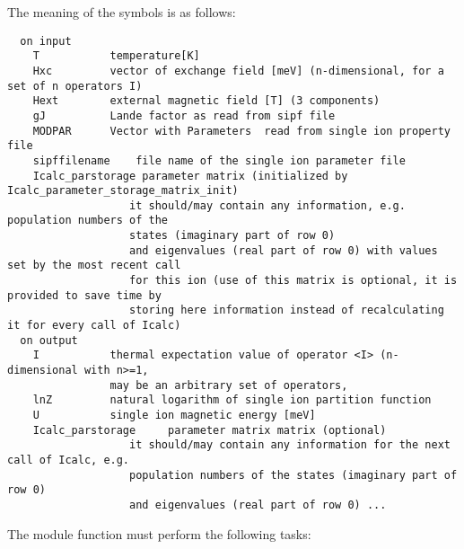 The meaning of the symbols is as follows:
{\footnotesize
\begin{verbatim}
  on input
    T           temperature[K]
    Hxc         vector of exchange field [meV] (n-dimensional, for a set of n operators I)
    Hext        external magnetic field [T] (3 components)
    gJ          Lande factor as read from sipf file
    MODPAR      Vector with Parameters  read from single ion property file
    sipffilename    file name of the single ion parameter file
    Icalc_parstorage parameter matrix (initialized by Icalc_parameter_storage_matrix_init)
                   it should/may contain any information, e.g. population numbers of the
                   states (imaginary part of row 0)
                   and eigenvalues (real part of row 0) with values set by the most recent call
                   for this ion (use of this matrix is optional, it is provided to save time by
                   storing here information instead of recalculating it for every call of Icalc)
  on output    
    I           thermal expectation value of operator <I> (n- dimensional with n>=1,
                may be an arbitrary set of operators,
    lnZ         natural logarithm of single ion partition function
    U           single ion magnetic energy [meV]
    Icalc_parstorage     parameter matrix matrix (optional)
                   it should/may contain any information for the next call of Icalc, e.g.
                   population numbers of the states (imaginary part of row 0)
                   and eigenvalues (real part of row 0) ...
\end{verbatim}
}
The module function must perform the following tasks:
